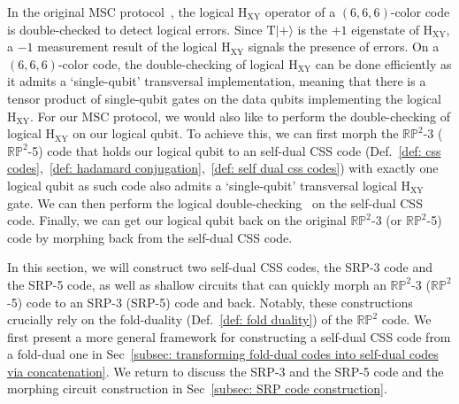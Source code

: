 \documentclass[reprint,aps,twocolumn,superscriptaddress,showpacs,notitlepage,10pt]{revtex4-2}
\theoremstyle{definition}
\begin{document}
In the original MSC protocol~\cite{gidney_magic_2024}, the logical $\mathrm{H}_{\mathrm{XY}}$ operator of a $(6,6,6)$-color code is double-checked to detect logical errors. Since $\mathrm{T}|+\rangle$ is the $+1$ eigenstate of $\mathrm{H}_{\mathrm{XY}}$, a $-1$ measurement result of the logical $\mathrm{H}_{\mathrm{XY}}$ signals the presence of errors. On a $(6,6,6)$-color code, the double-checking of logical $\mathrm{H}_{\mathrm{XY}}$ can be done efficiently as it admits a `single-qubit' transversal implementation, meaning that there is a tensor product of single-qubit gates on the data qubits implementing the logical $\mathrm{H}_{\mathrm{XY}}$. For our MSC protocol, we would also like to perform the double-checking of logical $\mathrm{H}_{\mathrm{XY}}$ on our logical qubit. To achieve this, we can first morph the $\mathbb{RP}^2$-3 ($\mathbb{RP}^2$-5) code that holds our logical qubit to an self-dual CSS code (Def.~\ref{def: css codes},~\ref{def: hadamard conjugation},~\ref{def: self dual css codes}) with exactly one logical qubit as such code also admits a `single-qubit' transversal logical $\mathrm{H}_{\mathrm{XY}}$ gate. We can then perform the logical double-checking~\cite{gidney_magic_2024} on the self-dual CSS code. Finally, we can get our logical qubit back on the original $\mathbb{RP}^2$-3 (or $\mathbb{RP}^2$-5) code by morphing back from the self-dual CSS code.  

In this section, we will construct two self-dual CSS codes, the SRP-3 code and the SRP-5 code, as well as shallow circuits that can quickly morph an $\mathbb{RP}^{2}$-3 ($\mathbb{RP}^2$-5) code to an SRP-3 (SRP-5) code and back. Notably, these constructions crucially rely on the fold-duality (Def.~\ref{def: fold duality}) of the $\mathbb{RP}^2$ code. We first present a more general framework for constructing a self-dual CSS code from a fold-dual one in Sec~\ref{subsec: transforming fold-dual codes into self-dual codes via concatenation}. We return to discuss the SRP-3 and the SRP-5 code and the morphing circuit construction in Sec~\ref{subsec: SRP code construction}.   
\end{document}

